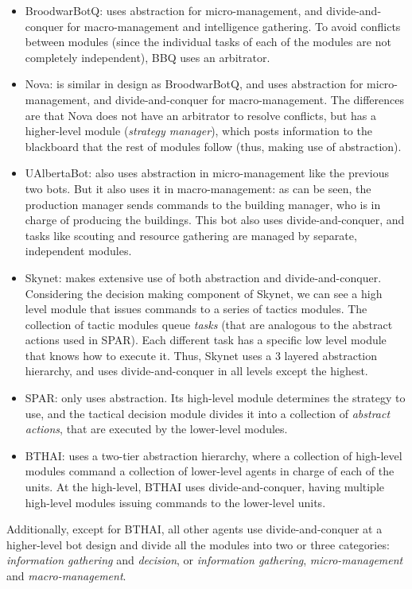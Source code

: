 \documentclass[journal]{IEEEtran}
\begin{document}
\begin{itemize}
\item BroodwarBotQ: uses abstraction for micro-management, and divide-and-conquer for macro-management and intelligence gathering. To avoid conflicts between modules (since the individual tasks of each of the modules are not completely independent), BBQ uses an arbitrator.
\item Nova: is similar in design as BroodwarBotQ, and uses abstraction for micro-management, and divide-and-conquer for macro-management. The differences are that Nova does not have an arbitrator to resolve conflicts, but has a higher-level module ({\em strategy manager}), which posts information to the blackboard that the rest of modules follow (thus, making use of abstraction).
\item UAlbertaBot: also uses abstraction in micro-management like the previous two bots. But it also uses it in macro-management: as can be seen, the production manager sends commands to the building manager, who is in charge of producing the buildings. This bot also uses divide-and-conquer, and tasks like scouting and resource gathering are managed by separate, independent modules.
\item Skynet: makes extensive use of both abstraction and divide-and-conquer. Considering the decision making component of Skynet, we can see a high level module that issues commands to a series of tactics modules. The collection of tactic modules queue {\em tasks} (that are analogous to the abstract actions used in SPAR). Each different task has a specific low level module that knows how to execute it. Thus, Skynet uses a 3 layered abstraction hierarchy, and uses divide-and-conquer in all levels except the highest.
\item SPAR: only uses abstraction. Its high-level module determines the strategy to use, and the tactical decision module divides it into a collection of {\em abstract actions}, that are executed by the lower-level modules.
\item BTHAI: uses a two-tier abstraction hierarchy, where a collection of high-level modules command a collection of lower-level agents in charge of each of the units. At the high-level, BTHAI uses divide-and-conquer, having multiple high-level modules issuing commands to the lower-level units.
\end{itemize}

Additionally, except for BTHAI, all other agents use divide-and-conquer at a higher-level bot design and divide all the modules into two or three categories: {\em information gathering} and {\em decision}, or {\em information gathering}, {\em micro-management} and {\em macro-management}.
\end{document}
